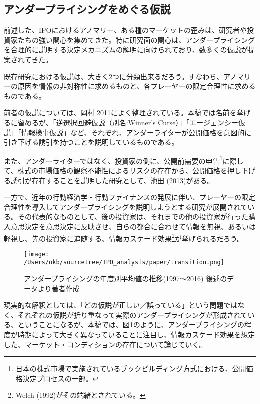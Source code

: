 \documentclass{jsarticle}
\begin{document}
\subsection{アンダープライシングをめぐる仮説}
前述した、IPOにおけるアノマリー、ある種のマーケットの歪みは、研究者や投資家たちの強い関心を集めてきた。特に研究面の関心は、アンダープライシングを合理的に説明する決定メカニズムの解明に向けられており、数多くの仮説が提案されてきた。\par
既存研究における仮説は、大きく2つに分類出来るだろう。すなわち、アノマリーの原因を情報の非対称性に求めるものと、各プレーヤーの限定合理性に求めるものである。\par
前者の仮説については、岡村 2011\cite{okamura}によく整理されている。本稿では名前を挙げるに留めるが、「逆選択回避仮説（別名:Winner's Curse）」「エージェンシー仮説」「情報検事仮説」など、それぞれ、アンダーライターが公開価格を意図的に引き下げる誘引を持つことを説明しているものである。\par

また、アンダーライターではなく、投資家の側に、公開前需要の申告\footnote[5]{日本の株式市場で実施されているブックビルディング方式における、公開価格決定プロセスの一部。}に際して、株式の市場価格の観察不能性によるリスクの存在から、公開価格を押し下げる誘引が存在することを説明した研究として、池田 (2013)\cite{ikeda}がある。\par

一方で、近年の行動経済学・行動ファイナンスの発展に伴い、プレーヤーの限定合理性を導入してアンダープライシングを説明しようとする研究が展開されている。その代表的なものとして、後の投資家は、それまでの他の投資家が行った購入意思決定を意思決定に反映させ、自らの都合に合わせて情報を無視、あるいは軽視し、先の投資家に追随する、情報カスケード効果\footnote[6]{Welch (1992)\cite{Welch}がその端緒とされている。}が挙げられるだろう。\par

\begin{figure}[h]
  \begin{center}
  \caption{アンダープライシングの年度別平均値の推移(1997〜2016) 後述のデータより著者作成}
    \texttt{[image: /Users/okb/sourcetree/IPO\_analysis/paper/transition.png]}
    \label{transition}
  \end{center}
\end{figure}


現実的な解釈としては、「どの仮説が正しい／誤っている」という問題ではなく、それぞれの仮説が折り重なって実際のアンダープライシングが形成されている、ということになるが、本稿では、図\ref{transition}のように、アンダープライシングの程度が時期によって大きく異なっていることに注目し、情報カスケード効果を想定した、マーケット・コンディションの存在について論じていく。
\end{document}
